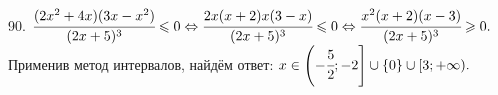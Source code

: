 90. $\cfrac{(2x^2+4x)(3x-x^2)}{(2x+5)^3}\leqslant 0\Leftrightarrow
\cfrac{2x(x+2)x(3-x)}{(2x+5)^3}\leqslant0\Leftrightarrow
\cfrac{x^2(x+2)(x-3)}{(2x+5)^3}\geqslant0.$ Применив метод интервалов, найдём ответ: $x\in\left(-\cfrac{5}{2};-2\right]\cup\{0\}\cup[3;+\infty).$
\begin{figure}[ht!]
\end{figure}\\

